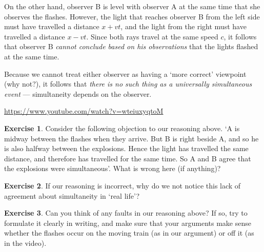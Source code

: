\documentclass[a4paper]{amsbook}
\newcommand{\goandwatch}[1]{
\begin{center}
\begin{tcolorbox}[width=0.8\textwidth,colback={SkyBlue!20},title={\textbf{Go and watch...}},colbacktitle=MidnightBlue,coltitle=White]
  \textcolor{MidnightBlue}{\url{#1}}
\end{tcolorbox}
\end{center}}
\theoremstyle{definition}
\newtheorem{exercise}{Exercise}
\numberwithin{exercise}{chapter}
\numberwithin{exercise}{chapter}
\begin{document}
On the other hand, observer B is level with observer A at the same time that she observes the flashes. However, the light that
reaches observer B from the left side must have travelled a distance $ x + vt $, and the light from the right must have travelled
a distance $ x - vt $. Since both rays travel at the same speed $ c $, it follows that observer B \emph{cannot conclude based on
his observations} that the lights flashed at the same time.

Because we cannot treat either observer as having a `more correct' viewpoint (why not?), it follows that \emph{there is no such
thing as a universally simultaneous event} --- simultaneity depends on the observer.

\goandwatch{https://www.youtube.com/watch?v=wteiuxyqtoM}


\begin{exercise}
  Consider the following objection to our reasoning above. `A is midway between the flashes when they arrive. But B is right
  beside A, and so he is also halfway between the explosions. Hence the light has travelled the same distance, and therefore has
  travelled for the same time. So A and B agree that the explosions were simultaneous'. What is wrong here (if anything)?
\end{exercise}

\begin{exercise}
  If our reasoning is incorrect, why do we not notice this lack of agreement about simultaneity in `real life'?
\end{exercise}

\begin{exercise}
  Can you think of any faults in our reasoning above? If so, try to formulate it clearly in writing, and make sure
  that your arguments make sense whether the flashes occur on the moving train (as in our argument) or off it (as in the video).
\end{exercise}
\end{document}
